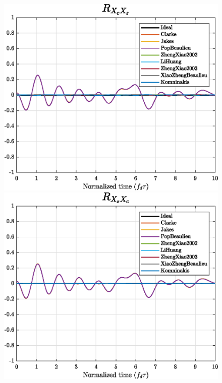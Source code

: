 \begin{figure}
	\vspace{2mm}
	
	\hfill
	\begin{minipage}{.49\linewidth}
		\includegraphics[width=\linewidth]{img/XcXs.eps}
	\end{minipage}
	\hfill
	\begin{minipage}{.49\linewidth}
		\includegraphics[width=\linewidth]{img/XsXc.eps}
	\end{minipage}
	\hfill
	

\end{figure}
